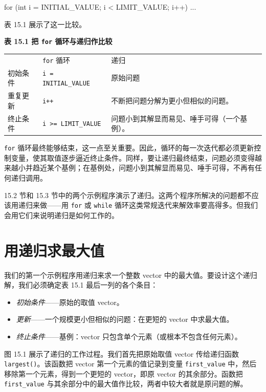 \begin{codebox}
for (int i = INITIAL_VALUE; i < LIMIT_VALUE; i++) ...
\end{codebox}

表 15.1 展示了这一比较。

\begin{center}
{\bfseries 表 15.1 把 \texttt{for} 循环与递归作比较}\par\vspace{3bp}
\begin{tabularx}{\textwidth}{XXX}
\toprule
 & \texttt{for} 循环 & 递归 \\
初始条件 & \texttt{i =\allowbreak{} INITIAL\_\allowbreak{}VALUE} & 原始问题 \\
重复更新 & \texttt{i++} & 不断把问题分解为更小但相似的问题。 \\
终止条件 & \texttt{i >=\allowbreak{} LIMIT\_\allowbreak{}VALUE} & 问题小到其解显而易见、唾手可得（一个基例）。 \\
\bottomrule
\end{tabularx}
\end{center}

\texttt{for} 循环最终能够结束，这一点至关重要。因此，循环的每一次迭代都必须更新控制变量，使其取值逐步逼近终止条件。同样，要让递归最终结束，问题必须变得越来越小并趋近某个基例；在基例处，问题小到其解显而易见、唾手可得，不再有任何递归调用。

15.2 节和 15.3 节中的两个示例程序演示了递归。这两个程序所解决的问题都不应该用递归来做——用 \texttt{for} 或 \texttt{while} 循环这类常规迭代来解效率要高得多。但我们会用它们来说明递归是如何工作的。

\section{用递归求最大值}

我们的第一个示例程序用递归来求一个整数 vector 中的最大值。要设计这个递归解，我们必须确定表 15.1 最后一列的各个条目：

\begin{itemize}
\item \emph{初始条件}——原始的取值 vector。
\item \emph{更新}——一个规模更小但相似的问题：在更短的 vector 中求最大值。
\item \emph{终止条件}——基例：vector 只包含单个元素（或根本不包含任何元素）。
\end{itemize}

图 15.1 展示了递归的工作过程。我们首先把原始取值 vector 传给递归函数 \texttt{largest()}。该函数把 vector 第一个元素的值记录到变量 \texttt{first\_\allowbreak{}value} 中，然后移除第一个元素，得到一个更短的 vector，即原 vector 的其余部分。函数把 \texttt{first\_\allowbreak{}value} 与其余部分中的最大值作比较，两者中较大者就是原问题的解。

